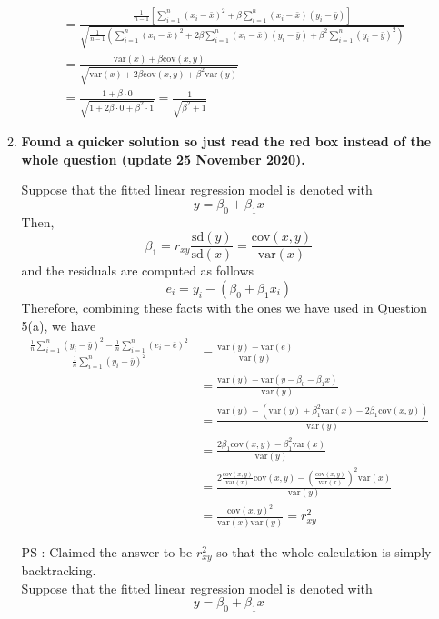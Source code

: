 \documentclass{article}
\begin{document}
\begin{enumerate}
\begin{enumerate}
\begin{align*}
            &=\frac{\frac{1}{n-1}\left[\sum_{i=1}^{n}(x_i-\bar{x})^2+\beta\sum_{i=1}^{n}(x_i-\bar{x})(y_i-\bar{y})\right]}{\sqrt{\frac{1}{n-1}\left(\sum_{i=1}^{n}(x_i-\bar{x})^2+2\beta\sum_{i=1}^{n}(x_i-\bar{x})(y_i-\bar{y})+\beta^2\sum_{i=1}^{n}(y_i-\bar{y})^2\right)}}\\
            &=\frac{\text{var}(x)+\beta\text{cov}(x,y)}{\sqrt{\text{var}(x)+2\beta\text{cov}(x,y)+\beta^2\text{var}(y)}}\\
            &=\frac{1+\beta\cdot0}{\sqrt{1+2\beta\cdot0+\beta^2\cdot1}} = \frac{1}{\sqrt{\beta^2+1}}
        \end{align*}
        
        \item \textbf{Found a quicker solution so just read the red box instead of the whole question (update 25 November 2020).}\\
        \begin{tcolorbox}[colback=red!10, colframe=red]
        Suppose that the fitted linear regression model is denoted with \[y=\beta_0+\beta_1x\]
        Then, \[\beta_1=r_{xy}\frac{\text{sd}(y)}{\text{sd}(x)}=\frac{\text{cov}(x,y)}{\text{var}(x)}\]
        and the residuals are computed as follows
        \[e_i=y_i-(\beta_0+\beta_1x_i)\]
        Therefore, combining these facts with the ones we have used in Question 5(a), we have
        \begin{align*}
            \frac{\frac{1}{n}\sum_{i=1}^{n}(y_i-\bar{y})^2-\frac{1}{n}\sum_{i=1}^{n}(e_i-\bar{e})^2}{\frac{1}{n}\sum_{i=1}^{n}(y_i-\bar{y})^2} &= \frac{\text{var}(y)-\text{var}(e)}{\text{var}(y)}\\
            &= \frac{\text{var}(y)-\text{var}(y-\beta_0-\beta_1x)}{\text{var}(y)}\\
            &= \frac{\text{var}(y)-(\text{var}(y)+\beta_1^2\text{var}(x)-2\beta_1\text{cov}(x,y))}{\text{var}(y)}\\
            &= \frac{2\beta_1\text{cov}(x,y)-\beta_1^2\text{var}(x)}{\text{var}(y)}\\
            &=\frac{2\frac{\text{cov}(x,y)}{\text{var}(x)}\text{cov}(x,y)-(\frac{\text{cov}(x,y)}{\text{var}(x)})^2\text{var}(x)}{\text{var}(y)}\\
            &=\frac{\text{cov}(x,y)^2}{\text{var}(x)\text{var}(y)}=r_{xy}^2
        \end{align*}
        \end{tcolorbox}
        PS : Claimed the answer to be $r_{xy}^2$ so that the whole calculation is simply backtracking.\\Suppose that the fitted linear regression model is denoted with \[y=\beta_0+\beta_1x\]

\end{enumerate}
\end{enumerate}
\end{document}
